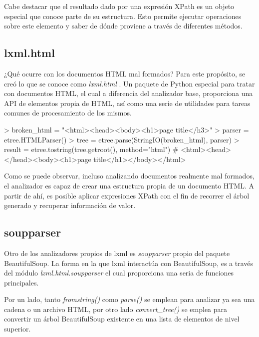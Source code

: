 Cabe destacar que el resultado dado por una expresión XPath es un objeto especial que conoce parte de su
estructura. Esto permite ejecutar operaciones sobre este elemento y saber de dónde proviene a través de
diferentes métodos.

\subsection{lxml.html}
\label{subsec:lxml.html}

¿Qué ocurre con los documentos HTML mal formados? Para este propósito, se creó lo que se conoce como
\emph{lxml.html} \cite{lxml-html}. Un paquete de Python especial para tratar con documentos HTML, el cual 
a diferencia del analizador base, proporciona una API de elementos propia de HTML, así como una serie de 
utilidades para tareas comunes de procesamiento de los mismos.

\begin{Schunk}
    \begin{Soutput}
        > broken_html = "<html><head><body><h1>page title</h3>"
        > parser = etree.HTMLParser()
        > tree   = etree.parse(StringIO(broken_html), parser)
        > result = etree.tostring(tree.getroot(), method="html")
        # <html><head></head><body><h1>page title</h1></body></html>
    \end{Soutput}
\end{Schunk}

Como se puede observar, incluso analizando documentos realmente mal formados, el analizador es capaz de
crear una estructura propia de un documento HTML. A partir de ahí, es posible aplicar expresiones XPath con
el fin de recorrer el árbol generado y recuperar información de valor.

\subsection{soupparser}
\label{subsec:soupparser}

Otro de los analizadores propios de lxml es \emph{soupparser} \cite{lxml-soup} propio del paquete
BeautifulSoup. La forma en la que lxml interactúa con BeautifulSoup, es a través del módulo 
\emph{lxml.html.soupparser} el cual proporciona una seria de funciones principales. 

Por un lado, tanto \emph{fromstring()} como \emph{parse()} se emplean para analizar ya sea una cadena o un 
archivo HTML, por otro lado \emph{convert\_tree()} se emplea para convertir un árbol BeautifulSoup existente 
en una lista de elementos de nivel superior.


